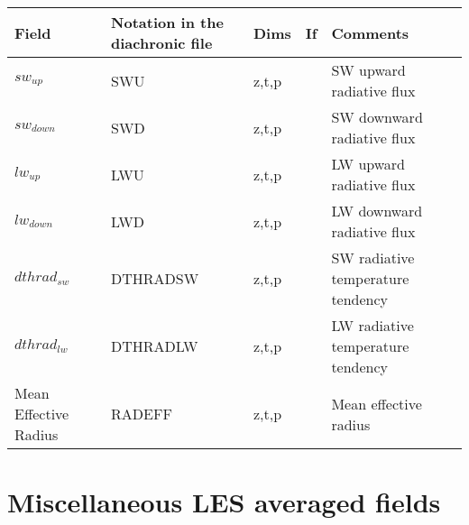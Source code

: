 \begingroup
\renewcommand\arraystretch{1.5}
\begin{longtable}[c]{|p{}|p{}|p{}|p{}|p{}|}
\hline
Field & Notation in the diachronic file & Dims & If  & Comments \\
\hline \hline
\endhead
$sw_{up}$             & SWU      & z,t,p & & SW upward radiative flux  \\\hline
$sw_{down}$           & SWD      & z,t,p & & SW downward radiative flux  \\\hline
$lw_{up}$             & LWU      & z,t,p & & LW upward radiative flux  \\\hline
$lw_{down}$           & LWD      & z,t,p & & LW downward radiative flux  \\\hline
$dthrad_{sw}$         & DTHRADSW & z,t,p & & SW radiative temperature tendency  \\\hline
$dthrad_{lw}$         & DTHRADLW & z,t,p & & LW radiative temperature tendency  \\\hline
Mean Effective Radius & RADEFF   & z,t,p & & Mean effective radius  \\\hline
\end{longtable}
\endgroup


\section{Miscellaneous LES averaged fields}

